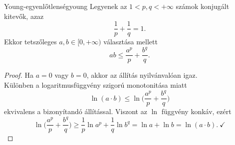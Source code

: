 \documentclass[
]{elteikthesis}[2024/04/26]
\begin{document}
	\begin{lemma}{Young-egyenlőtlenség}{young}
		Legyenek az \( 1 < p, q < +\infty \) számok konjugált kitevők, azaz
		\[
			\frac{1}{p} + \frac{1}{q} = 1.
		\]
		Ekkor tetszőleges \( a, b \in [0, +\infty) \) választása mellett
		\[
			ab \leq \frac{a^p}{p} + \frac{b^q}{q}.
		\]
	\end{lemma}
	\begin{proof}
		Ha \( a = 0 \) vagy \( b = 0 \), akkor az állítás nyilvánvalóan igaz.\\[6pt]
		Különben a logaritmusfüggvény szigorú monotonitása miatt
		\[
			\ln( a \cdot b ) \leq
			\ln \biggl( \frac{a^p}{p} + \frac{b^q}{q} \biggr)
		\]
		ekvivalens a bizonyítandó állítással.
		Viszont az \( \ln \) függvény konkáv, ezért
		\[
		\ln \biggl( \frac{a^p}{p} + \frac{b^q}{q} \biggr) \geq
		\frac{1}{p} \ln a^p + \frac{1}{q} \ln b^q =
		\ln a + \ln b =
		\ln( a \cdot b ). \ \checkmark
		\]
	\end{proof}
	
\end{document}
